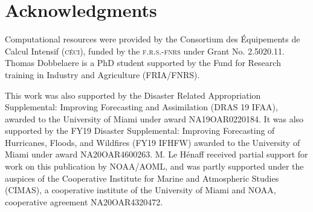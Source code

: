 \documentclass[preprint,12pt,authoryear]{elsarticle}
\begin{document}
\section*{Acknowledgments}
Computational resources were provided by the Consortium des \'Equipements de Calcul Intensif (\textsc{c\'eci}), funded by the \textsc{f.r.s.-fnrs} under Grant No. 2.5020.11. Thomas Dobbelaere is a PhD student supported by the Fund for Research training in Industry and Agriculture (\textsc{FRIA}/\textsc{FNRS}).

This work was also supported by the Disaster Related Appropriation Supplemental: Improving Forecasting and Assimilation (DRAS 19 IFAA), awarded to the University of Miami under award NA19OAR0220184. It was also supported by the FY19 Disaster Supplemental: Improving Forecasting of Hurricanes, Floods, and Wildfires (FY19 IFHFW) awarded to the University of Miami under award NA20OAR4600263. M. Le H\'enaff received partial support for work on this publication by NOAA/AOML, and was partly supported under the auspices of the Cooperative Institute for Marine and Atmospheric Studies (CIMAS), a cooperative institute of the University of Miami and NOAA, cooperative agreement NA20OAR4320472.

 

\end{document}
